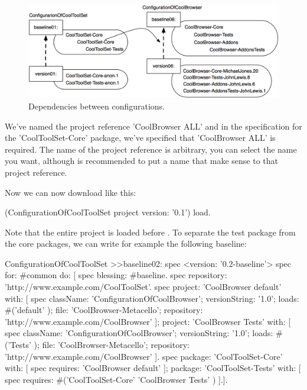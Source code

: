 \documentclass[a4paper,10pt,twoside]{book}
\begin{document}
\begin{figure}
\begin{center}
\includegraphics[width=0.6\linewidth]{version07}
\caption{Dependencies between configurations.\label{fig:version07}}
\end{center}
\end{figure} 


We've named the project reference 'CoolBrowser ALL' and in the specification for the 'CoolToolSet-Core' package, we've specified that 'CoolBrowser ALL' is required. The name of the project reference is arbitrary, you can select the name you want, although is recommended to put a name that make sense to that project reference. 

Now we can now download  like this:

\begin{code}{}
(ConfigurationOfCoolToolSet project version: '0.1') load.
\end{code}

Note that the entire  project is loaded before . To separate the test package from the core packages, we can write for example the following baseline:

\begin{code}{}
ConfigurationOfCoolToolSet >>baseline02: spec 
	<version: '0.2-baseline'>
	spec for: #common do: [
		spec blessing: #baseline.
		spec repository: 'http://www.example.com/CoolToolSet'.
		spec
			project: 'CoolBrowser default' with: [
				spec
					className: 'ConfigurationOfCoolBrowser';
					versionString: '1.0';
					loads: #('default' );
					file: 'CoolBrowser-Metacello';
					repository: 'http://www.example.com/CoolBrowser' ];
			project: 'CoolBrowser Tests' with: [
				spec
					className: 'ConfigurationOfCoolBrowser';
					versionString: '1.0';
					loads: #('Tests' );
					file: 'CoolBrowser-Metacello';
					repository: 'http://www.example.com/CoolBrowser' ].
		spec 
			package: 'CoolToolSet-Core' with: [ spec requires: 'CoolBrowser default' ];
			package: 'CoolToolSet-Tests' with: [ 
				spec requires: #('CoolToolSet-Core'  'CoolBrowser Tests'  ) ].].			
\end{code}
\end{document}
